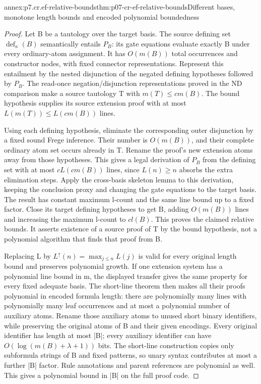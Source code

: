 \begin{annexitem}{annex:p7.cr.ef-relative-bounds}{thm:p07-cr-ef-relative-bounds}{Different bases, monotone length bounds and encoded polynomial boundedness}
\begin{proof}
Let B be a tautology over the target basis. The source defining
set \(\operatorname{def}_{\kappa}(B)\) semantically entails
\(P_B\): its gate equations evaluate exactly B under every
ordinary-atom assignment. It has \(O(m(B))\) total occurrences
and constructor nodes, with fixed connector representations.
Represent this entailment by the nested disjunction of the negated
defining hypotheses followed by \(P_B\). The read-once
negation/disjunction representations proved in the ND comparison
make a source tautology T with \(m(T)\leq c m(B)\).
The bound hypothesis supplies its source extension proof with at
most \(L(m(T))\leq L(c m(B))\) lines.

Using each defining hypothesis, eliminate the corresponding
outer disjunction by a fixed sound Frege inference. Their number
is \(O(m(B))\), and their complete ordinary atom set occurs
already in T. Rename the proof's new extension atoms away from
those hypotheses. This gives a legal derivation of \(P_B\)
from the defining set with at most \(c L(c m(B))\) lines,
since \(L(n)\geq n\) absorbs the extra elimination steps.
Apply the cross-basis skeleton lemma to this derivation, keeping
the conclusion proxy and changing the gate equations to the
target basis. The result has constant maximum l-count and the
same line bound up to a fixed factor. Close its target defining
hypotheses to get B, adding \(O(m(B))\) lines and increasing
the maximum l-count to \(c l(B)\). This proves the claimed
relative bounds. It asserts existence of a source proof of T
by the bound hypothesis, not a polynomial algorithm that finds
that proof from B.

Replacing L by \(L^\uparrow(n)=\max_{j\leq n}L(j)\) is valid
for every original length bound and preserves polynomial growth.
If one extension system has a polynomial line bound in m,
the displayed transfer gives the same property for every fixed
adequate basis. The short-line theorem then makes all their
proofs polynomial in encoded formula length: there are polynomially
many lines with polynomially many leaf occurrences and at most
a polynomial number of auxiliary atoms. Rename those auxiliary
atoms to unused short binary identifiers, while preserving the
original atoms of B and their given encodings. Every original
identifier has length at most |B|; every auxiliary identifier
can have \(O(\log(m(B)+\lambda+1))\) bits. The short-line
construction copies only subformula strings of B and fixed
patterns, so unary syntax contributes at most a further |B|
factor. Rule annotations and parent references are polynomial
as well. This gives a polynomial bound in |B| on the full proof code.


\end{proof}
\end{annexitem}
